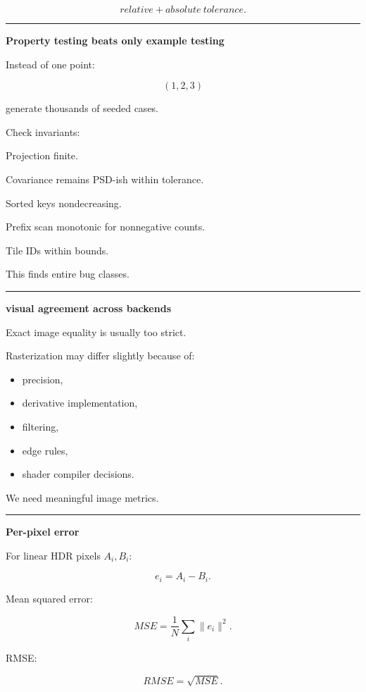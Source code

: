 \[
relative+absolute\ tolerance.
\]

\begin{center}\rule{0.5\linewidth}{0.5pt}\end{center}

\textbf{Property testing beats only example testing}

Instead of one point:

\[
(1,2,3)
\]

generate thousands of seeded cases.

Check invariants:

Projection finite.

Covariance remains PSD-ish within tolerance.

Sorted keys nondecreasing.

Prefix scan monotonic for nonnegative counts.

Tile IDs within bounds.

This finds entire bug classes.

\begin{center}\rule{0.5\linewidth}{0.5pt}\end{center}

\textbf{visual agreement across backends}

Exact image equality is usually too strict.

Rasterization may differ slightly because of:

\begin{itemize}
\tightlist
\item
  precision,
\item
  derivative implementation,
\item
  filtering,
\item
  edge rules,
\item
  shader compiler decisions.
\end{itemize}

We need meaningful image metrics.

\begin{center}\rule{0.5\linewidth}{0.5pt}\end{center}

\textbf{Per-pixel error}

For linear HDR pixels \(A_i,B_i\):

\[
e_i=A_i-B_i.
\]

Mean squared error:

\[
MSE=
\frac1N
\sum_i
\|e_i\|^2.
\]

RMSE:

\[
\boxed{
RMSE=
\sqrt{MSE}.
}
\]

